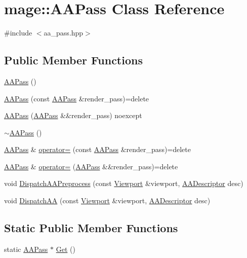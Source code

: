 \hypertarget{classmage_1_1_a_a_pass}{}\section{mage\+:\+:A\+A\+Pass Class Reference}
\label{classmage_1_1_a_a_pass}


{\ttfamily \#include $<$aa\+\_\+pass.\+hpp$>$}

\subsection*{Public Member Functions}
\begin{DoxyCompactItemize}
\item 
\hyperlink{classmage_1_1_a_a_pass_a252ae39e2a24d3c82294aa9f308877b1}{A\+A\+Pass} ()
\item 
\hyperlink{classmage_1_1_a_a_pass_ad51f0e6fb81fe0f61f9e1eddb5571f98}{A\+A\+Pass} (const \hyperlink{classmage_1_1_a_a_pass}{A\+A\+Pass} \&render\+\_\+pass)=delete
\item 
\hyperlink{classmage_1_1_a_a_pass_a8413c0094a0393c48c33b1beb20caffd}{A\+A\+Pass} (\hyperlink{classmage_1_1_a_a_pass}{A\+A\+Pass} \&\&render\+\_\+pass) noexcept
\item 
\hyperlink{classmage_1_1_a_a_pass_af7660ffa2372608eb597918026ef1e19}{$\sim$\+A\+A\+Pass} ()
\item 
\hyperlink{classmage_1_1_a_a_pass}{A\+A\+Pass} \& \hyperlink{classmage_1_1_a_a_pass_a6ca1b1c932026a4270b5e738c2d63b40}{operator=} (const \hyperlink{classmage_1_1_a_a_pass}{A\+A\+Pass} \&render\+\_\+pass)=delete
\item 
\hyperlink{classmage_1_1_a_a_pass}{A\+A\+Pass} \& \hyperlink{classmage_1_1_a_a_pass_a30ea0c8c3eb57cb4995cb3232bde6514}{operator=} (\hyperlink{classmage_1_1_a_a_pass}{A\+A\+Pass} \&\&render\+\_\+pass)=delete
\item 
void \hyperlink{classmage_1_1_a_a_pass_a02d5dc1bf51385e13d81c6304be2c9ae}{Dispatch\+A\+A\+Preprocess} (const \hyperlink{classmage_1_1_viewport}{Viewport} \&viewport, \hyperlink{namespacemage_a86cd40b8f2f42ca4d616cc6ec665a7f2}{A\+A\+Descriptor} desc)
\item 
void \hyperlink{classmage_1_1_a_a_pass_a43acad147f780a11881b72c4d9a6c0f6}{Dispatch\+AA} (const \hyperlink{classmage_1_1_viewport}{Viewport} \&viewport, \hyperlink{namespacemage_a86cd40b8f2f42ca4d616cc6ec665a7f2}{A\+A\+Descriptor} desc)
\end{DoxyCompactItemize}
\subsection*{Static Public Member Functions}
\begin{DoxyCompactItemize}
\item 
static \hyperlink{classmage_1_1_a_a_pass}{A\+A\+Pass} $\ast$ \hyperlink{classmage_1_1_a_a_pass_a45b63b6ea60b3709556da1e00f0ab672}{Get} ()
\end{DoxyCompactItemize}
